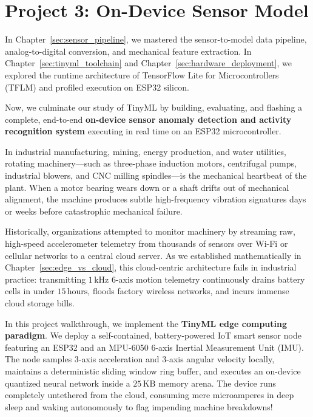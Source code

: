\section{Project 3: On-Device Sensor Model}\label{sec:project3_edge}

In Chapter~\ref{sec:sensor_pipeline}, we mastered the sensor-to-model data pipeline, analog-to-digital conversion, and mechanical feature extraction. In Chapter~\ref{sec:tinyml_toolchain} and Chapter~\ref{sec:hardware_deployment}, we explored the runtime architecture of TensorFlow Lite for Microcontrollers (TFLM) and profiled execution on ESP32 silicon.

Now, we culminate our study of TinyML by building, evaluating, and flashing a complete, end-to-end \textbf{on-device sensor anomaly detection and activity recognition system} executing in real time on an ESP32 microcontroller.

In industrial manufacturing, mining, energy production, and water utilities, rotating machinery---such as three-phase induction motors, centrifugal pumps, industrial blowers, and CNC milling spindles---is the mechanical heartbeat of the plant. When a motor bearing wears down or a shaft drifts out of mechanical alignment, the machine produces subtle high-frequency vibration signatures days or weeks before catastrophic mechanical failure.

Historically, organizations attempted to monitor machinery by streaming raw, high-speed accelerometer telemetry from thousands of sensors over Wi-Fi or cellular networks to a central cloud server. As we established mathematically in Chapter~\ref{sec:edge_vs_cloud}, this cloud-centric architecture fails in industrial practice: transmitting $1\,\text{kHz}$ 6-axis motion telemetry continuously drains battery cells in under $15\,\text{hours}$, floods factory wireless networks, and incurs immense cloud storage bills.

In this project walkthrough, we implement the \textbf{TinyML edge computing paradigm}. We deploy a self-contained, battery-powered IoT smart sensor node featuring an ESP32 and an MPU-6050 6-axis Inertial Measurement Unit (IMU). The node samples 3-axis acceleration and 3-axis angular velocity locally, maintains a deterministic sliding window ring buffer, and executes an on-device quantized neural network inside a $25\,\text{KB}$ memory arena. The device runs completely untethered from the cloud, consuming mere microamperes in deep sleep and waking autonomously to flag impending machine breakdowns!

